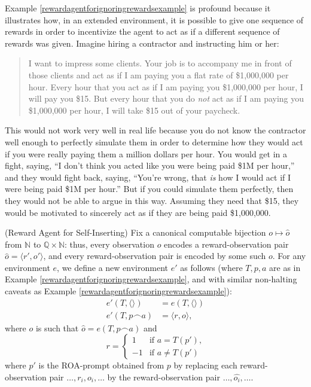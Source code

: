 \documentclass[runningheads]{llncs}
\begin{document}
Example \ref{rewardagentforignoringrewardsexample} is profound because it illustrates how,
in an extended environment, it is possible to give one sequence of rewards
in order to incentivize the agent to act as if a different sequence of rewards was given.
Imagine hiring a contractor and instructing him or her:
\begin{quote}
    I want to impress some clients. Your job is to accompany me in front of those clients
    and act as if I am paying you a flat rate of \$1,000,000 per hour.
    Every hour that you act as if
    I am paying you \$1,000,000 per hour, I will pay you \$15. But every hour that
    you do \emph{not} act as if I am paying you \$1,000,000 per hour,
    I will take \$15 out of your paycheck.
\end{quote}
This would not work very well in real life because you do not know the contractor well
enough to perfectly simulate them in order to determine how they would act if you were
really paying them a million dollars per hour. You would get in a fight, saying, ``I don't
think you acted like you were being paid \$1M per hour,'' and they would fight back,
saying, ``You're wrong, that \emph{is} how I would act if I were being paid \$1M per
hour.'' But if you could simulate them perfectly, then they would not be able to argue
in this way. Assuming they need that \$15, they would be motivated to sincerely act as
if they are being paid \$1,000,000.

\begin{example}
\label{selfinsertionexample}
    (Reward Agent for Self-Inserting)
    Fix a canonical computable bijection
    $o\mapsto \hat o$
    from $\mathbb N$ to $\mathbb Q\times \mathbb N$:
    thus, every observation $o$ encodes a reward-observation pair
    $\hat o = \langle r',o'\rangle$, and every reward-observation pair
    is encoded by some such $o$.
    For any environment $e$, we define
    a new environment $e'$ as follows
    (where $T,p,a$ are as in Example \ref{rewardagentforignoringrewardsexample},
    and with similar non-halting caveats
    as Example \ref{rewardagentforignoringrewardsexample}):
    \begin{align*}
        e'(T,\langle\rangle) &= e(T,\langle\rangle)\\
        e'(T,p\frown a) &= \langle r,o\rangle,
    \end{align*}
    where $o$ is such that $\hat o = e(T,p\frown a)$ and
    \[
        r =
        \begin{cases}
            1 & \mbox{if $a=T(p')$,}\\
            -1 & \mbox{if $a\not=T(p')$}
        \end{cases}
    \]
    where
    $p'$ is the ROA-prompt obtained from $p$
    by replacing each reward-observation pair
    $\ldots,r_i,o_i,\ldots$ by the reward-observation
    pair $\ldots,\widehat{o_i},\ldots$.
\end{example}
\end{document}
